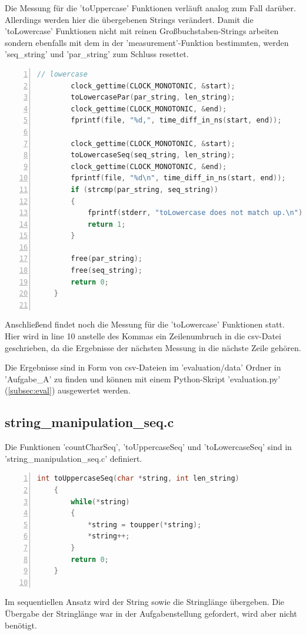 \documentclass[plainarticle,zihtitle,german,final,hyperref,utf8]{zihpub}
\begin{document}
Die Messung für die 'toUppercase' Funktionen verläuft analog zum Fall darüber. Allerdings werden hier die übergebenen Strings verändert. Damit die 'toLowercase' Funktionen nicht mit reinen Großbuchstaben-Strings arbeiten sondern ebenfalls mit dem in der 'measurement'-Funktion bestimmten, werden 'seq\_string' und 'par\_string' zum Schluss  resettet.

\begin{lstlisting}[language=c, numbers=left]		
		// lowercase
		clock_gettime(CLOCK_MONOTONIC, &start);	
		toLowercasePar(par_string, len_string);
		clock_gettime(CLOCK_MONOTONIC, &end);
		fprintf(file, "%d,", time_diff_in_ns(start, end));	
		
		clock_gettime(CLOCK_MONOTONIC, &start);	
		toLowercaseSeq(seq_string, len_string);
		clock_gettime(CLOCK_MONOTONIC, &end);
		fprintf(file, "%d\n", time_diff_in_ns(start, end));	
		if (strcmp(par_string, seq_string))
		{
			fprintf(stderr, "toLowercase does not match up.\n");
			return 1;
		}
		
		free(par_string);
		free(seq_string);
		return 0;
	}
	
\end{lstlisting}

Anschließend findet noch die Messung für die 'toLowercase' Funktionen statt.
Hier wird in line 10 anstelle des Kommas ein Zeilenumbruch in die csv-Datei geschrieben, da die Ergebnisse der nächsten Messung in die nächste Zeile gehören.

Die Ergebnisse sind in Form von csv-Dateien im 'evaluation/data' Ordner in 'Aufgabe\_A' zu finden und können mit einem Python-Skript 'evaluation.py' (\ref{subsec:eval}) ausgewertet werden.


\subsection{string\_manipulation\_seq.c}
Die Funktionen 'countCharSeq', 'toUppercaseSeq' und 'toLowercaseSeq' sind in 'string\_manipulation\_seq.c' definiert.

\begin{lstlisting}[language=c, numbers=left]
	int toUppercaseSeq(char *string, int len_string)
	{
		while(*string)
		{
			*string = toupper(*string);
			*string++;
		}
		return 0;
	}
	
\end{lstlisting}

Im sequentiellen Ansatz wird der String sowie die Stringlänge übergeben. Die Übergabe der Stringlänge war in der Aufgabenstellung gefordert, wird aber nicht benötigt.
\end{document}
